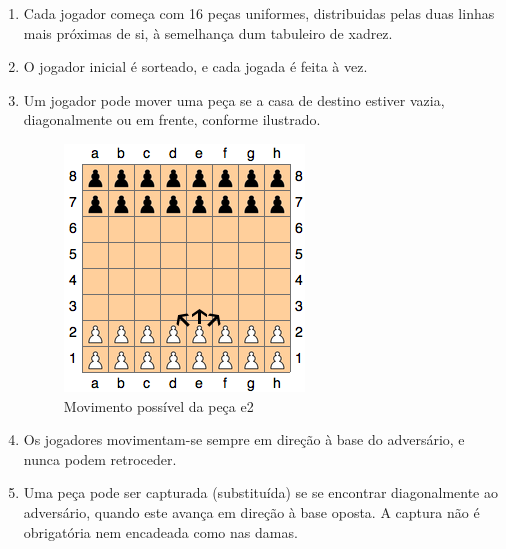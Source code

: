 \documentclass[15pt,a4paper]{article}
\begin{document}
\begin{enumerate}
\item Cada jogador começa com 16 peças uniformes, distribuidas pelas duas linhas mais próximas de si, à semelhança dum tabuleiro de xadrez.
\item O jogador inicial é sorteado, e cada jogada é feita à vez.
\item Um jogador pode mover uma peça se a casa de destino estiver vazia, diagonalmente ou em frente, conforme ilustrado.

\begin{figure}[h!]
\begin{center}
\includegraphics[scale=0.5]{fig1.png}
\caption{Movimento possível da peça e2}
\label{fig:1}
\end{center}
\end{figure}

\item Os jogadores movimentam-se sempre em direção à base do adversário, e nunca podem retroceder.
\item Uma peça pode ser capturada (substituída) se se encontrar diagonalmente ao adversário, quando este avança em direção à base oposta. A captura não é obrigatória nem encadeada como nas damas.


\end{enumerate}
\end{document}
